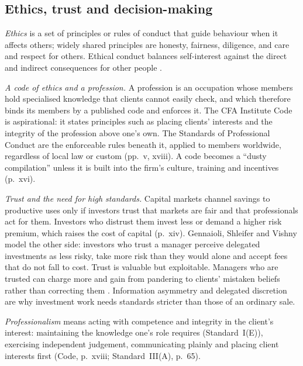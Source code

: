 \subsection{Ethics, trust and decision-making}

\begin{qfdefinition}\label{def:ethics-trust-professions}
 \emph{Ethics} is a set of principles or rules of conduct that guide behaviour when it affects others; widely shared principles are honesty, fairness, diligence, and care and respect for others. Ethical conduct balances self-interest against the direct and indirect consequences for other people \citep[p.~xiii]{standards-practice-handbook-2024}.

\emph{A code of ethics and a profession.} A profession is an occupation whose members hold specialised knowledge that clients cannot easily check, and which therefore binds its members by a published code and enforces it. The CFA Institute Code is aspirational: it states principles such as placing clients' interests and the integrity of the profession above one's own. The Standards of Professional Conduct are the enforceable rules beneath it, applied to members worldwide, regardless of local law or custom (pp.~v, xviii). A code becomes a ``dusty compilation'' unless it is built into the firm's culture, training and incentives (p.~xvi).

\emph{Trust and the need for high standards.} Capital markets channel savings to productive uses only if investors trust that markets are fair and that professionals act for them. Investors who distrust them invest less or demand a higher risk premium, which raises the cost of capital (p.~xiv). Gennaioli, Shleifer and Vishny model the other side: investors who trust a manager perceive delegated investments as less risky, take more risk than they would alone and accept fees that do not fall to cost. Trust is valuable but exploitable. Managers who are trusted can charge more and gain from pandering to clients' mistaken beliefs rather than correcting them \citep[NBER WP 18174, pp.~1--5]{gennaioli-shleifer-vishny-money-doctors-2012}. Information asymmetry and delegated discretion are why investment work needs standards stricter than those of an ordinary sale.

\emph{Professionalism} means acting with competence and integrity in the client's interest: maintaining the knowledge one's role requires (Standard~I(E)), exercising independent judgement, communicating plainly and placing client interests first (Code, p.~xviii; Standard~III(A), p.~65).


\end{qfdefinition}

